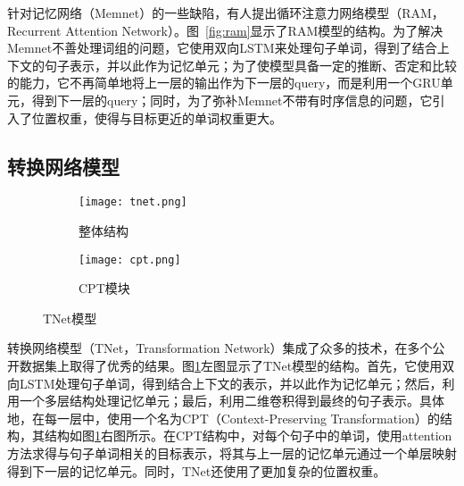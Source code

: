 针对记忆网络（Memnet）的一些缺陷，有人提出循环注意力网络模型（RAM，Recurrent Attention Network）\cite{Al2017Deep}。图~\ref{fig:ram}显示了RAM模型的结构。为了解决Memnet不善处理词组的问题，它使用双向LSTM来处理句子单词，得到了结合上下文的句子表示，并以此作为记忆单元；为了使模型具备一定的推断、否定和比较的能力，它不再简单地将上一层的输出作为下一层的query，而是利用一个GRU\cite{cho2014learning}单元，得到下一层的query；同时，为了弥补Memnet不带有时序信息的问题，它引入了位置权重，使得与目标更近的单词权重更大。

\subsection{转换网络模型}

\begin{figure}[h]
	\centering%
	\begin{subfigure}{0.5\textwidth}
		\centering
		\texttt{[image: tnet.png]}
		\caption{整体结构}
	\end{subfigure}%
	\begin{subfigure}{0.5\textwidth}
		\centering
		\texttt{[image: cpt.png]}
		\caption{CPT模块}
	\end{subfigure}
	\caption{TNet模型}
	\label{fig:tnet}
\end{figure}

转换网络模型（TNet，Transformation Network）\cite{Xin2018Transformation}集成了众多的技术，在多个公开数据集上取得了优秀的结果。图\ref{fig:tnet}左图显示了TNet模型的结构。首先，它使用双向LSTM处理句子单词，得到结合上下文的表示，并以此作为记忆单元；然后，利用一个多层结构处理记忆单元；最后，利用二维卷积得到最终的句子表示。具体地，在每一层中，使用一个名为CPT（Context-Preserving Transformation）的结构，其结构如图\ref{fig:tnet}右图所示。在CPT结构中，对每个句子中的单词，使用attention方法求得与句子单词相关的目标表示，将其与上一层的记忆单元通过一个单层映射得到下一层的记忆单元。同时，TNet还使用了更加复杂的位置权重。